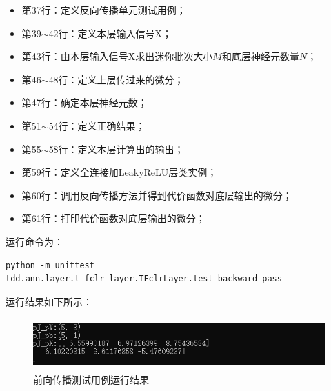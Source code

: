 \documentclass[UTF8]{article}
\begin{document}
\begin{itemize}
\item 第37行：定义反向传播单元测试用例；
\item 第39$\sim$42行：定义本层输入信号X；
\item 第43行：由本层输入信号X求出迷你批次大小$M$和底层神经元数量$N$；
\item 第46$\sim$48行：定义上层传过来的微分；
\item 第47行：确定本层神经元数；
\item 第51$\sim$54行：定义正确结果；
\item 第55$\sim$58行：定义本层计算出的输出；
\item 第59行：定义全连接加LeakyReLU层类实例；
\item 第60行：调用反向传播方法并得到代价函数对底层输出的微分；
\item 第61行：打印代价函数对底层输出的微分；
\end{itemize}
运行命令为：
\begin{lstlisting}
python -m unittest tdd.ann.layer.t_fclr_layer.TFclrLayer.test_backward_pass
\end{lstlisting}
运行结果如下所示：
\begin{figure}[H]
	\caption{前向传播测试用例运行结果}
	\label{f000071}
	\centering
	\includegraphics[height=2.0cm]{images/f000071}
\end{figure}
\end{document}
